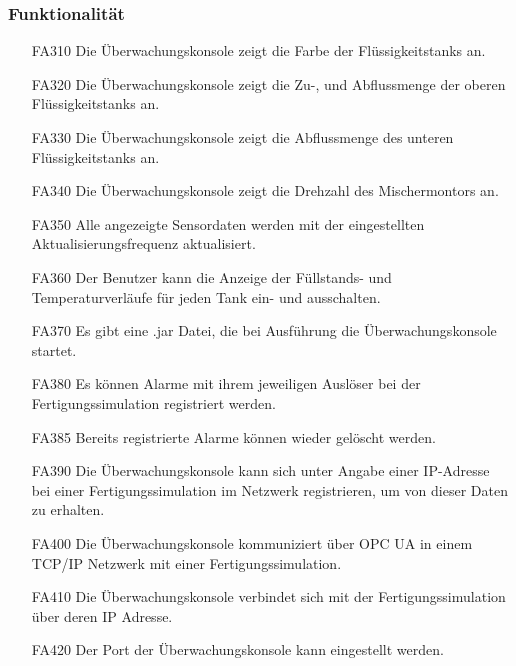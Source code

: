 \documentclass[parskip=full]{scrartcl}
\begin{document}
\subsubsection{Funktionalität}
\begin{enumerate}
\item[FA310] Die Überwachungskonsole zeigt die Farbe der Flüssigkeitstanks an.
\item[FA320] Die Überwachungskonsole zeigt die Zu-, und Abflussmenge der oberen Flüssigkeitstanks an.
\item[FA330] Die Überwachungskonsole zeigt die Abflussmenge des unteren Flüssigkeitstanks an.
\item[FA340] Die Überwachungskonsole zeigt die Drehzahl des Mischermontors an.
\item[FA350] Alle angezeigte Sensordaten werden mit der eingestellten Aktualisierungsfrequenz aktualisiert.
\item[FA360] Der Benutzer kann die Anzeige der Füllstands- und Temperaturverläufe für jeden Tank ein- und ausschalten.
\item[FA370] Es gibt eine .jar Datei, die bei Ausführung die Überwachungskonsole startet.
\item[FA380] Es k\"onnen Alarme mit ihrem jeweiligen Ausl\"oser bei der Fertigungssimulation registriert werden.
\item[FA385] Bereits registrierte Alarme k\"onnen wieder gel\"oscht werden.
\item[FA390] Die \"Uberwachungskonsole kann sich unter Angabe einer IP-Adresse bei einer Fertigungssimulation im Netzwerk
  registrieren, um von dieser Daten zu erhalten.
\item[FA400] Die Überwachungskonsole kommuniziert über OPC UA in einem TCP/IP Netzwerk mit einer Fertigungssimulation. 
\item[FA410] Die Überwachungskonsole verbindet sich mit der Fertigungssimulation über deren IP Adresse. 
\item[FA420] Der Port der Überwachungskonsole kann eingestellt werden.
\end{enumerate}
\end{document}
